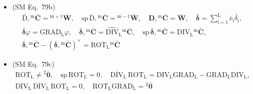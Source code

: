 \documentclass[
    12pt,              %
    a4paper,           %
    headings=normal,   %
    twoside=true,      %
    BCOR=8mm,          %
]{scrbook}
\begin{document}
\begin{itemize}[label={},leftmargin=0pt]
    \item (SM Eq.\ 79b) 
    \[
    \begin{gathered}
    \bar{\mathrm{D}}, {}^\mathrm{m}\bar{\mathbf{C}} = {}^{\mathrm{m}+1}\bar{\mathbf{W}}, \quad \mathrm{sp}\,\bar{\mathrm{D}}, {}^\mathrm{m}\bar{\mathbf{C}} = {}^{\mathrm{m}-1}\bar{\mathbf{W}}, \quad \mathbf{D}, {}^\mathrm{m}\bar{\mathbf{C}} = \bar{\mathbf{W}}, \quad \bar{\bm{\delta}} = \sum_{\mathrm{i}=1}^\mathrm{L} \bar{\mathrm{e}}_\mathrm{i} \bar{\delta}_\mathrm{i}, \\
    \bar{\bm{\delta}}\varphi = \mathrm{GRAD}_\mathrm{L} \varphi, \quad \bar{\bm{\delta}}, {}^\mathrm{m}\bar{\mathbf{C}} = \widehat{\mathrm{DIV}}_\mathrm{L} {}^\mathrm{m}\bar{\mathbf{C}}, \quad \mathrm{sp}\,\bar{\bm{\delta}}, {}^\mathrm{m}\bar{\mathbf{C}} = \mathrm{DIV}_\mathrm{L} {}^\mathrm{m}\bar{\mathbf{C}}, \\
    \bar{\bm{\delta}}, {}^\mathrm{m}\bar{\mathbf{C}} - (\bar{\bm{\delta}}, {}^\mathrm{m}\bar{\mathbf{C}})^\times = \mathrm{ROT}_\mathrm{L} {}^\mathrm{m}\bar{\mathbf{C}}
    \end{gathered}
    \]

    \item (SM Eq.\ 79c) 
    \[
    \begin{gathered}
    \mathrm{ROT}_\mathrm{L} \ne {}^2\bar{\mathbf{0}}, \quad \mathrm{sp}\,\mathrm{ROT}_\mathrm{L} = 0, \quad \overline{\mathrm{DIV}}_\mathrm{L}\, \mathrm{ROT}_\mathrm{L} = \mathrm{DIV}_\mathrm{L} \mathrm{GRAD}_\mathrm{L} - \mathrm{GRAD}_\mathrm{L} \mathrm{DIV}_\mathrm{L}, \\
    \mathrm{DIV}_\mathrm{L}\, \overline{\mathrm{DIV}}_\mathrm{L}\, \mathrm{ROT}_\mathrm{L} = 0, \quad \mathrm{ROT}_\mathrm{L} \mathrm{GRAD}_\mathrm{L} = {}^2\bar{\mathbf{0}}
    \end{gathered}
    \]


\end{itemize}
\end{document}
